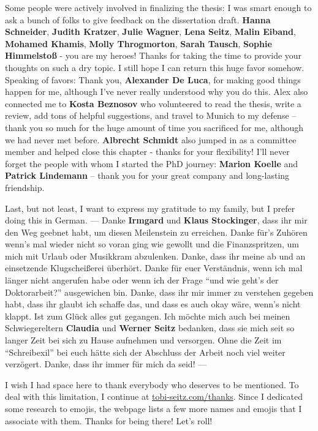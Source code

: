 Some people were actively involved in finalizing the thesis: I was smart enough to ask a bunch of folks to give feedback on the dissertation draft. \textbf{Hanna Schneider}, \textbf{Judith Kratzer}, \textbf{Julie Wagner}, \textbf{Lena Seitz}, \textbf{Malin Eiband}, \textbf{Mohamed Khamis}, \textbf{Molly Throgmorton}, \textbf{Sarah Tausch}, \textbf{Sophie Himmelstoß} - you are my heroes! Thanks for taking the time to provide your thoughts on such a dry topic. I still hope I can return this huge favor somehow. Speaking of favors: Thank you, \textbf{Alexander De Luca}, for making good things happen for me, although I’ve never really understood why you do this. Alex also connected me to \textbf{Kosta Beznosov} who volunteered to read the thesis, write a review, add tons of helpful suggestions, and travel to Munich to my defense -- thank you so much for the huge amount of time you sacrificed for me, although we had never met before. \textbf{Albrecht Schmidt} also jumped in as a committee member and helped close this chapter - thanks for your flexibility! I'll never forget the people with whom I started the PhD journey: \textbf{Marion Koelle} and \textbf{Patrick Lindemann} -- thank you for your great company and long-lasting friendship. 

Last, but not least, I want to express my gratitude to my family, but I prefer doing this in German. 
---
Danke \textbf{Irmgard} und \textbf{Klaus Stockinger}, dass ihr mir den Weg geebnet habt, um diesen Meilenstein zu erreichen. Danke für’s Zuhören wenn’s mal wieder nicht so voran ging wie gewollt und die Finanzspritzen, um mich mit Urlaub oder Musikkram abzulenken. Danke, dass ihr meine ab und an einsetzende Klugscheißerei überhört. Danke für euer Verständnis, wenn ich mal länger nicht angerufen habe oder wenn ich der Frage “und wie geht’s der Doktorarbeit?” ausgewichen bin. Danke, dass ihr mir immer zu verstehen gegeben habt, dass ihr glaubt ich schaffe das, und dass es auch okay wäre, wenn’s nicht klappt. Ist zum Glück alles gut gegangen. Ich möchte mich auch bei meinen Schwiegereltern \textbf{Claudia} und \textbf{Werner Seitz} bedanken, dass sie mich seit so langer Zeit bei sich zu Hause aufnehmen und versorgen. Ohne die Zeit im “Schreibexil” bei euch hätte sich der Abschluss der Arbeit noch viel weiter verzögert. Danke, dass ihr immer für mich da seid!  ---

I wish I had space here to thank everybody who deserves to be mentioned. To deal with this limitation, I continue at \url{tobi-seitz.com/thanks}. Since I dedicated some research to emojis, the webpage lists a few more names and emojis that I associate with them. \linebreak
Thanks for being there! Let's roll!

\cleardoublepage